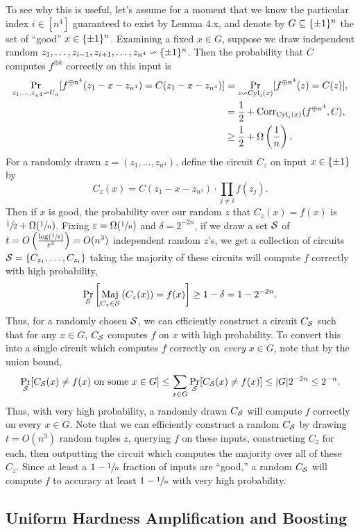 \documentclass[11pt]{article}
\begin{document}
To see why this is useful, let's assume for a moment that we know the particular index $i \in [n^4]$ guaranteed to exist by Lemma 4.x, and denote by $G \subseteq \{\pm 1\}^n$ the set of ``good'' $x \in \{\pm 1\}^n$. Examining a fixed $x \in G$, suppose we draw independent random $z_1, \ldots, z_{i - 1}, z_{i + 1}, \ldots, z_{n^4} \backsim \{\pm 1\}^n$. Then the probability that $C$ computes $f^{\oplus k}$ correctly on this input is
\begin{align*}
    \Pr_{z_1, \ldots, z_{n^4} \backsim U_n}[f^{\oplus n^4}(z_1 - x - z_{n^4}) = C(z_1 - x - z_{n^4})] & = \Pr_{z \backsim \textup{Cyl}_i(x)}[f^{\oplus n^4}(z) = C(z)], \\ & = \frac{1}{2} + \mathrm{Corr}_{\textup{Cyl}_i(x)}(f^{\oplus n^4}, C), \\ & \geq \frac{1}{2} + \Omega\left(\frac{1}{n}\right).
\end{align*}
For a randomly drawn $z = (z_1, \ldots, z_{n^4})$, define the circuit $C_z$ on input $x \in \{\pm 1\}$ by 
\begin{equation*}
    C_z(x) = C(z_1 - x - z_{n^4}) \cdot \prod_{j \neq i} f(z_j).
\end{equation*}
Then if $x$ is good, the probability over our random $z$ that $C_z(x) = f(x)$ is $\sfrac{1}{2} + \Omega(\sfrac{1}{n})$. Fixing $\varepsilon = \Omega(\sfrac{1}{n})$ and $\delta = 2^{-2n}$, if we draw a set $\mathcal{S}$  of $t = O\left(\frac{\log\left(\sfrac{1}{\delta}\right)}{\varepsilon^2}\right) = O(n^3)$ independent random $z$'s, we get a collection of circuits $\mathcal{S} = \{C_{z_1}, \ldots, C_{z_t}\}$ taking the majority of these circuits will compute $f$ correctly with high probability,
\begin{equation*}
    \Pr_{\mathcal{S}}\left[\mathop{\textup{Maj}}_{C_z \in \mathcal{S}}\left(C_z(x)\right) = f(x)\right] \geq 1 - \delta = 1 - 2^{-2n}.
\end{equation*}
Thus, for a randomly chosen $\mathcal{S}$, we can efficiently construct a circuit $C_{\mathcal{S}}$ such that for any $x \in G$, $C_{\mathcal{S}}$ computes $f$ on $x$ with high probability. To convert this into a single circuit which computes $f$ correctly on \emph{every} $x \in G$, note that by the union bound, 
\begin{equation*}
    \Pr_{\mathcal{S}}[C_{\mathcal{S}}(x) \neq f(x) \text{ on some } x \in G] \leq \sum_{x \in G} \Pr_{\mathcal{S}}[C_{\mathcal{S}}(x) \neq f(x)] \leq |G|2^{-2n} \leq 2^{-n}.
\end{equation*}
Thus, with very high probability, a randomly drawn $C_{\mathcal{S}}$ will compute $f$ correctly on every $x \in G$. Note that we can efficiently construct a random $C_{\mathcal{S}}$ by drawing $t = O(n^3)$ random tuples $z$, querying $f$ on these inputs, constructing $C_z$ for each, then outputting the circuit which computes the majority over all of these $C_z$. Since at least a $1 - \sfrac{1}{n}$ fraction of inputs are ``good,'' a random $C_{\mathcal{S}}$ will compute $f$ to accuracy at least $1 - \sfrac{1}{n}$ with very high probability. 


\subsection{Uniform Hardness Amplification and Boosting}




\end{document}
